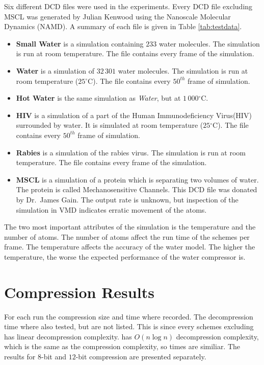 \documentclass[a4paper]{report}
\newcommand{\degree}{\ensuremath{^\circ}}
\begin{document}
Six different DCD files were used in the experiments. Every DCD file excluding
MSCL was generated by Julian Kenwood using the Nanoscale Molecular Dynamics
(NAMD). A summary of each file is given in Table \ref{tab:testdata}.

\begin{itemize}
\item{\textbf{Small Water}} is a simulation containing $233$ water
  molecules. The simulation is run at room temperature. The file contains
  every frame of the simulation.
\item{\textbf{Water}} is a simulation of $32\,301$ water molecules. The
  simulation is run at room temperature ($25\degree$C). The file contains
  every $50^{th}$ frame of simulation.
\item{\textbf{Hot Water}} is the same simulation as \emph{Water}, but at
  $1\,000\degree$C.
\item{\textbf{HIV}} is a simulation of a part of the Human Immunodeficiency
  Virus(HIV) surrounded by water. It is simulated at room temperature
  ($25\degree$C). The file contains every $50^{th}$ frame of simulation.
\item{\textbf{Rabies}} is a simulation of the rabies virus. The simulation is
  run at room temperature. The file contains every frame of the simulation.
\item{\textbf{MSCL}} is a simulation of a protein which is separating two
  volumes of water. The protein is called Mechanosensitive Channels. This DCD
  file was donated by Dr.~James Gain. The output rate is unknown, but
  inspection of the simulation in VMD indicates erratic movement of the atoms.
\end{itemize}

The two most important attributes of the simulation is the temperature and the
number of atoms. The number of atoms affect the run time of the schemes per
frame. The temperature affects the accuracy of the water model. The higher the
temperature, the worse the expected performance of the water compressor is.

\section{Compression Results}

For each run the compression size and time where recorded. The decompression
time where also tested, but are not listed. This is since every schemes
excluding \citep{devillers2000gci} has linear decompression
complexity. \citep{devillers2000gci} has $O(n \log n)$ decompression
complexity, which is the same as the compression complexity, so times are
similiar. The results for $8$-bit and $12$-bit compression are presented
separately.
\end{document}
